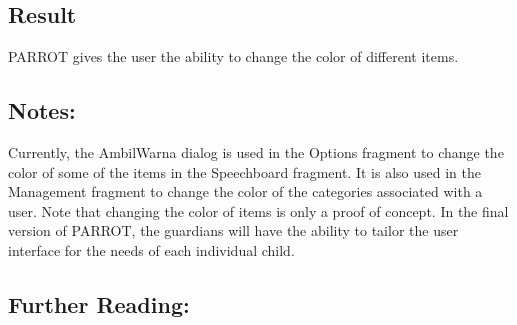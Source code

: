 \subsection*{Result}
PARROT gives the user the ability to change the color of different items.\newline

\subsection*{Notes:}
Currently, the AmbilWarna dialog is used in the Options fragment %
to change the color of some of the items in the Speechboard fragment. It is also used in the Management fragment to change the color of the categories associated with a user.\newline
Note that changing the color of items is only a proof of concept. In the final version of PARROT, the guardians will have the ability to tailor the user interface for the needs of each individual child.\newline

\subsection{Further Reading:}
